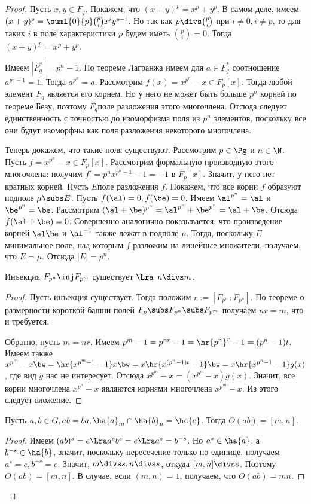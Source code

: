 \documentclass[a4paper]{article}
\begin{document}
\begin{proof}
Пусть $x,y \in F_q$. Покажем, что $(x+y)^p=x^p+y^p$. В самом  деле, имеем
$(x+y)^p=\suml{0}{p}\binom{p}{i}x^iy^{p-i}$. Но так как $p \divs \binom{p}{i}$ при $i \neq 0, i \neq p$, то
для таких $i$ в поле характеристики $p$ будем иметь $\binom{p}{i}=0$. Тогда $(x+y)^p=x^p+y^p$.

Имеем $|F_q^*|=p^n-1$. По теореме Лагранжа имеем для $a \in F_q^*$  соотношение $a^{p^n-1}=1$. Тогда
$a^{p^n}=a$. Рассмотрим $f(x)=x^{p^n}-x \in F_p[x]$. Тогда любой элемент $F_q$ является его корнем. Но у него
не может быть больше $p^n$ корней по теореме Безу, поэтому $F_q$\т поле разложения этого многочлена. Отсюда
следует единственность с точностью до изоморфизма поля из $p^n$ элементов, поскольку все они будут изоморфны
как поля разложения некоторого многочлена.

Теперь докажем, что такие поля существуют. Рассмотрим  $p \in \Pg$ и $n \in \N$. Пусть $f=x^{p^n}-x \in
F_p[x]$. Рассмотрим формальную производную этого многочлена: получим $f'=p^nx^{p^n-1}-1=-1$ в $F_p[x]$.
Значит, у него нет кратных корней. Пусть $E$\т поле разложения $f$. Покажем, что все корни $f$ образуют
подполе $\mu \subs E$. Пусть $f(\al)=0, f(\be)=0$. Имеем $\al^{p^n}=\al$ и $\be^{p^n}=\be$. Рассмотрим
$(\al+\be)^{p^n}=\al^{p^n}+\be^{p^n}=\al+\be$. Отсюда $f(\al+\be)=0$. Совершенно аналогично показывается, что
произведение корней $\al\be$ и $\al^{-1}$ также лежат в подполе $\mu$. Тогда, поскольку $E$\т минимальное
поле, над которым $f$ разложим на линейные множители, получаем, что $E = \mu$. Отсюда $|E|=p^n$.

\begin{theorem}
Инъекция $F_{p^n} \inj F_{p^m}$ существует $\Lra$ $n\divs m$.
\end{theorem}
\begin{proof}
Пусть инъекция существует. Тогда положим $r:=[F_{p^m}:F_{p^n}]$.  По теореме о размерности короткой башни
полей $F_p \subs F_{p^n} \subs F_{p^m}$ получаем $nr=m$, что и требуется.

Обратно, пусть $m=nr$. Имеем $p^m-1=p^{nr}-1=\hr{p^n}^r-1=(p^n-1)t$. Имеем также $x^{p^m}-x \bw=
\hr{x^{p^m-1}-1} x \bw= x\hr{x^{(p^n-1)t}-1} \bw= x\hr{x^{p^n-1}-1}g(x)$,  где вид $g$ нас не интересует. Отсюда
$x^{p^m}-x=(x^{p^n}-x)g(x)$. Значит, все корни многочлена $x^{p^n}-x$ являются корнями многочлена $x^{p^m}-x$.
Из этого следует вложение.
\end{proof}

\begin{theorem}
Пусть $a,b \in G, ab=ba, \ha{a}_m\cap\ha{b}_n=\hc{e}$. Тогда $O(ab)=[m,n]$.
\end{theorem}
\begin{proof}
Имеем $(ab)^s=e \Lra a^sb^s=e \Lra a^s=b^{-s}$. Но
$a^s \in \ha{a}$, а $b^{-s} \in \ha{b}$, значит, поскольку
пересечение только по единице, получаем $a^s=e, b^{-s}=e$. Значит,
$m \divs s, n \divs s$, откуда $[m,n] \divs s$. Поэтому
$O(ab)=[m,n]$. В случае, если $(m,n)=1$, получаем, что $O(ab)=mn$.
\end{proof}


\end{proof}
\end{document}
